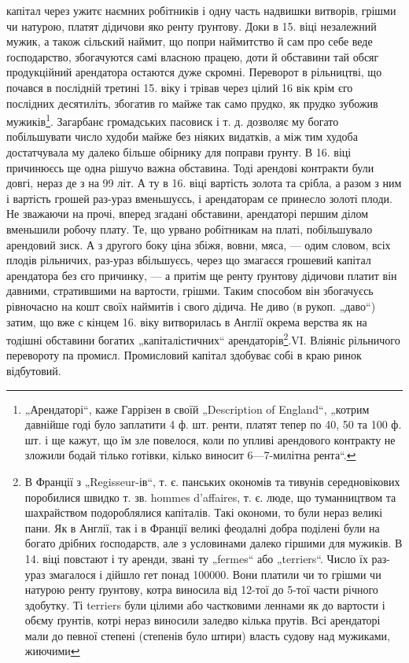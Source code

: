 капітал через ужитє наємних робітників і одну часть надвишки витворів, грішми чи натурою, платят
дідичови яко ренту ґрунтову. Доки в 15. віці незалежний мужик, а також сільский наймит, що попри
наймитство й сам про себе веде ґосподарство, збогачуются самі власною працею, доти й обставини тай
обсяг продукційний арендатора остаются дуже скромні. Переворот в рільництві, що почався в послідній
третині 15. віку і трівав через цілий 16 вік крім єго послідних десятиліть, збогатив го майже так
само прудко, як прудко зубожив мужиків\footnote{
„Арендаторі“, каже Гаррізен в своїй „Description of England“, „котрим давнійше годі було
заплатити 4 ф. шт. ренти, платят тепер по 40, 50 та 100 ф. шт. і ще кажут, що їм зле повелося, коли
по упливі арендового контракту не зложили бодай тілько готівки, кілько виносит 6—7-милітна рента“.
}. Загарбанє громадських пасовиск і т. д. дозволяє му
богато побільшувати число худоби майже без ніяких видатків, а між тим худоба достатчувала му далеко
більше обірнику для поправи ґрунту. В 16. віці причинюєсь ще одна рішучо важна обставина. Тоді
арендові контракти були довгі, нераз де з на 99 літ. А ту в 16. віці вартість золота та срібла, а
разом з ним і вартість грошей раз-ураз вменьшуєсь, і арендаторам се принесло золоті плоди. Не
зважаючи на прочі, вперед згадані обставини, арендаторі першим ділом вменьшили робочу плату. Те, що
урвано робітникам на платі, побільшувало
арендовий зиск. А з другого боку ціна збіжя, вовни, мяса, — одим словом, всіх плодів рільничих,
раз-ураз вбільшуєсь, через що змагаєся грошевий капітал арендатора
без єго причинку, — а притім ще ренту ґрунтову дідичови платит він давними, стратившими на вартости,
грішми. Таким способом він збогачуєсь рівночасно на кошт своїх наймитів і свого дідича. Не диво (в
рукоп. „даво“) затим, що вже с кінцем 16. віку витворилась в Англії окрема верства як на тодішні
обставини богатих „капіталістичних“ арендаторів\footnote{
В Франції з „Regisseur-ів“, т. є. панських окономів та тивунів середновікових поробилися швидко
т. зв. hommes d'affaires, т. є. люде, що туманництвом та шахрайством подороблялися капіталів. Такі
окономи, то були нераз великі пани. Як в Англії, так і в Франції великі феодалні добра поділені були
на богато дрібних ґосподарств, але з условинами далеко гіршими для мужиків. В 14. віці повстают і ту
аренди, звані ту „fermes“ або „terriers“. Число їх раз-ураз змагалося і дійшло гет понад
100000. Вони платили чи то грішми чи натурою ренту ґрунтову, котра виносила від 12-тої до 5-тої
части річного здобутку. Ті terriers були цілими або частковими леннами як до вартости і обєму
ґрунтів, котрі нераз виносили заледво кілька прутів. Всі арендаторі мали до певної степені (степенів
було штири) власть судову над мужиками, жиючими
}.VI.    Вліяніє рільничого перевороту па промисл.
Промисловий капітал здобуває собі в краю ринок
відбутовий.

